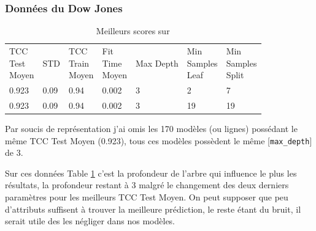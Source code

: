\documentclass[10pt,letterpaper]{article}
\newlength\savedwidth
\newcommand\thickhline{\noalign{\global\savedwidth\arrayrulewidth\global\arrayrulewidth 2pt}%
\hline
\noalign{\global\arrayrulewidth\savedwidth}}
\begin{document}
\subsubsection*{Données du Dow Jones}

\begin{table}[h]
  {\centering
  \caption{Meilleurs scores sur \protect{}}
  \label{table:scores_dj}
  \begin{adjustbox}{width=\textwidth}
\begin{tabular}{lllllll}
\hline
\thead{TCC \\Test\\ Moyen} & STD & \thead{TCC\\ Train \\Moyen} & \thead{Fit \\Time\\ Moyen} & Max Depth & \thead{Min \\Samples \\Leaf} & \thead{Min \\Samples \\Split}
\\ \thickhline
0.923 & 0.09 & \hspace{5mm}0.94 & \hspace{5mm}0.002 & \hspace{5mm}3 & \hspace{5mm}2 &\hspace{5mm}7 \\ \hline
0.923 & 0.09 & \hspace{5mm}0.94 & \hspace{5mm}0.002 & \hspace{5mm}3 & \hspace{5mm}19 &\hspace{5mm}19 \\ \hline
\end{tabular}
\end{adjustbox}}
\footnotesize{Par soucis de représentation j’ai omis les 170 modèles (ou lignes) possédant le même TCC Test Moyen (0.923), tous ces modèles possèdent le même [\verb!max_depth!] de 3.}
\end{table}

Sur ces données Table \ref{table:scores_dj} c’est la profondeur de l’arbre qui influence le plus les résultats, la profondeur restant à 3 malgré le changement des deux derniers paramètres pour les meilleurs TCC Test Moyen. On peut supposer que peu d’attributs suffisent à trouver la meilleure prédiction, le reste étant du bruit, il serait utile des les négliger dans nos modèles.
\end{document}

